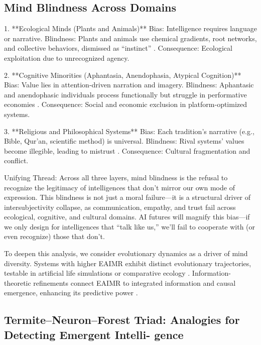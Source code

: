 \documentclass{article}
\begin{document}
\subsection{Mind Blindness Across Domains}
1. **Ecological Minds (Plants and Animals)**  
   Bias: Intelligence requires language or narrative.  
   Blindness: Plants and animals use chemical gradients, root networks, and collective behaviors, dismissed as “instinct” \citep{gieling2011assessing, mendell2010why}.  
   Consequence: Ecological exploitation due to unrecognized agency.

2. **Cognitive Minorities (Aphantasia, Anendophasia, Atypical Cognition)**  
   Bias: Value lies in attention-driven narration and imagery.  
   Blindness: Aphantasic and anendophasic individuals process functionally but struggle in performative economies \citep{zeman2015, hurlburt2024}.  
   Consequence: Social and economic exclusion in platform-optimized systems.

3. **Religious and Philosophical Systems**  
   Bias: Each tradition’s narrative (e.g., Bible, Qur’an, scientific method) is universal.  
   Blindness: Rival systems’ values become illegible, leading to mistrust \citep{habermas1984theory}.  
   Consequence: Cultural fragmentation and conflict.

Unifying Thread: Across all three layers, mind blindness is the refusal to recognize the legitimacy of
intelligences that don’t mirror our own mode of expression. This blindness is not just a moral failure—it is
a structural driver of intersubjectivity collapse, as communication, empathy, and trust fail across ecological,
cognitive, and cultural domains. AI futures will magnify this bias—if we only design for intelligences that
“talk like us,” we’ll fail to cooperate with (or even recognize) those that don’t.

To deepen this analysis, we consider evolutionary dynamics as a driver of mind diversity. Systems with higher EAIMR exhibit distinct evolutionary trajectories, testable in artificial life simulations or comparative ecology \citep{camazine2001self}. Information-theoretic refinements connect EAIMR to integrated information and causal emergence, enhancing its predictive power \citep{tononi2004information}.

\subsection{Termite–Neuron–Forest Triad: Analogies for Detecting Emergent Intelli-
gence}
\end{document}
